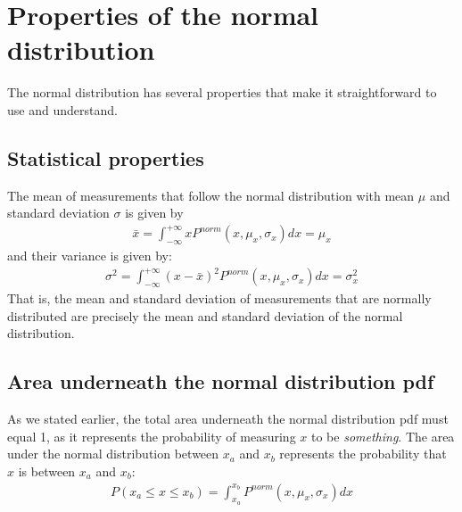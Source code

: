 \section{Properties of the normal distribution}
The normal distribution has several properties that make it straightforward to use and understand.
\subsection{Statistical properties}
The mean of measurements that follow the normal distribution with mean $\mu$ and standard deviation $\sigma$ is given by
\begin{align}
\bar x = \int_{-\infty}^{+\infty}xP^{norm}(x,\mu_x,\sigma_x)dx=\mu_x
\end{align}
and their variance is given by:
\begin{align}
\sigma^2 = \int_{-\infty}^{+\infty}(x-\bar x)^2P^{norm}(x,\mu_x,\sigma_x)dx=\sigma_x^2
\end{align}
That is, the mean and standard deviation of measurements that are normally distributed are precisely the mean and standard deviation of the normal distribution.

\subsection{Area underneath the normal distribution pdf}
As we stated earlier, the total area underneath the normal distribution pdf must equal 1, as it represents the probability of measuring $x$ to be \textit{something}. The area under the normal distribution between $x_a$ and $x_b$ represents the probability that $x$ is between $x_a$ and $x_b$:
\begin{align}
P(x_a \leq x \leq x_b) = \int_{x_a}^{x_b}P^{norm}(x,\mu_x,\sigma_x)dx
\end{align}

